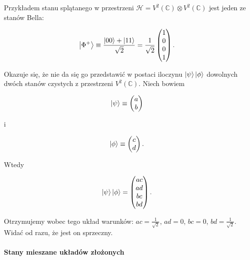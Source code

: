 \begin{example}
    Przykładem stanu splątanego w przestrzeni $\mathcal{H} = V ^ 2(\mathbb{C}) \otimes V ^ 2(\mathbb{C})$ jest jeden ze stanów Bella:

    \begin{equation}
        \label{equation:bellstate}
        \ket{\Phi ^ {+}} \equiv \frac{\ket{00} + \ket{11}}{\sqrt{2}} = \frac{1}{\sqrt{2}}
        \begin{pmatrix}
            1 \\
            0 \\
            0 \\
            1
        \end{pmatrix}.
    \end{equation}

    Okazuje się, że nie da się go przedstawić w postaci iloczynu $\ket{\psi} \ket{\phi}$ dowolnych dwóch stanów czystych z przestrzeni $V ^ 2(\mathbb{C})$. Niech bowiem

    $$
        \ket{\psi} \equiv
        \begin{pmatrix}
            a \\
            b \\
        \end{pmatrix}
    $$

    i

    $$
        \ket{\phi} \equiv
        \begin{pmatrix}
            c \\
            d \\
        \end{pmatrix}.
    $$

    Wtedy

    $$
        \ket{\psi} \ket{\phi} =
        \begin{pmatrix}
            ac \\
            ad \\
            bc \\
            bd \\
        \end{pmatrix}.
    $$

    Otrzymujemy wobec tego układ warunków: $ac = \frac{1}{\sqrt{2}}$, $ad = 0$, $bc = 0$, $bd = \frac{1}{\sqrt{2}}$. Widać od razu, że jest on sprzeczny.
\end{example}

\paragraph{Stany mieszane układów złożonych}

